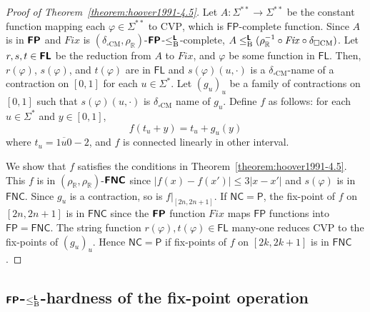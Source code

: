 \documentclass[conference]{IEEEtran}
\newcommand{\R}{\mathbb R}
\newcommand{\classonefont}[1]{\mathsf{#1}}
\newcommand{\classFL}{\classonefont{FL}}
\newcommand{\classP}{\classonefont{P}}
\newcommand{\classFP}{\classonefont{FP}}
\newcommand{\classNC}{\classonefont{NC}}
\newcommand{\classFNC}{\classonefont{FNC}}
\newcommand{\classtwofont}[1]{\text{\bfseries \sffamily \upshape #1}}
\newcommand{\classLtwo}{\classtwofont{L}}
\newcommand{\classFLtwo}{\classtwofont{FL}}
\newcommand{\classFNCtwo}{\classtwofont{FNC}}
\newcommand{\classFPtwo}{\classtwofont{FP}}
\newcommand{\deltaboxCM}{\delta _{\square \mathrm{CM}}}
\newcommand{\rhoR}{\rho _\R}
\newcommand{\redB}{\leq _{\mathrm B}}
\newcommand{\redLB}{\redB ^{\classLtwo}}
\newcommand{\LM}{\varSigma ^{**}}
\newcommand{\probCVP}{\mathrm{CVP}}
\newcommand{\OpCMFix}{\mathit{Fix}}
\theoremstyle{definition}
\theoremstyle{remark}
\begin{document}
\begin{proof}[Proof of Theorem~\ref{theorem:hoover1991-4.5}]
 Let $A \colon \LM \to \LM$ be the constant function mapping each $\varphi \in \LM$ to $\probCVP$, which is $\classFP$-complete function.
 Since  $A$ is in $\classFPtwo$ and $\OpCMFix$ is $(\deltaboxCM, \rhoR)$-$\classFPtwo$-$\redLB$-complete, $A \redLB (\rhoR^{-1} \circ \OpCMFix \circ \deltaboxCM)$.
 Let $r,s,t \in \classFLtwo$ be the reduction from $A$ to $\OpCMFix$,
 and $\varphi$ be some function in $\classFL$.
 Then, $r(\varphi)$, $s(\varphi)$, and $t(\varphi)$ are in $\classFL$ and
 $s(\varphi)(u, \cdot)$ is a $\deltaboxCM$-name of a contraction on $[0,1]$ 
 for each $u \in \varSigma^*$.
 Let $(g_u)_u$ be a family of contractions on $[0,1]$
 such that $s(\varphi)(u, \cdot)$ is $\deltaboxCM$ name of $g_u$.
 Define $f$ as follows: for each $u \in \varSigma^*$ and $y \in [0, 1]$,
 \begin{equation}
  \label{eq:def-f}
 f(t_u + y) = t_u + g_u(y)
 \end{equation}
 where $t_u = \overline{1u0}-2$, 
 and $f$ is connected linearly in other interval.

 We show that $f$ satisfies the conditions in Theorem~\ref{theorem:hoover1991-4.5}.
 This $f$ is in $(\rhoR, \rhoR)$-$\classFNCtwo$ since 
 $|f(x) - f(x')| \le 3|x-x'|$ and $s(\varphi)$ is in $\classFNC$.
 Since $g_u$ is a contraction, so is $f|_{[2n, 2n+1]}$.
 If $\classNC = \classP$,
 the fix-point of $f$ on $[2n, 2n+1]$ 
 is in $\classFNC$ since the $\classFPtwo$ function 
 $\OpCMFix$ maps $\classFP$ functions into $\classFP = \classFNC$.
 The string function $r(\varphi), t(\varphi) \in \classFL$ many-one reduces
 $\probCVP$ to the fix-points of $(g_u)_u$.
 Hence $\classNC = \classP$ if fix-points of $f$ on $[2k, 2k+1]$ is in $\classFNC$.
\end{proof}

\subsection{$\classFPtwo$-$\redLB$-hardness of the fix-point operation}
\end{document}
